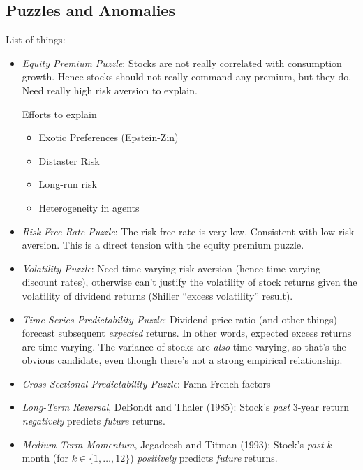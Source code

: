 \documentclass[12pt]{article}
\theoremstyle{plain}
\theoremstyle{definition}
\theoremstyle{remark}
\begin{document}
\clearpage
\subsection{Puzzles and Anomalies}

List of things:
\begin{itemize}
  \item \emph{Equity Premium Puzzle}:
    Stocks are not really correlated with consumption growth.
    Hence stocks should not really command any premium, but they do.
    Need really high risk aversion to explain.

    Efforts to explain
    \begin{itemize}
      \item Exotic Preferences (Epstein-Zin)
      \item Distaster Risk
      \item Long-run risk
      \item Heterogeneity in agents
    \end{itemize}

  \item
    \emph{Risk Free Rate Puzzle}:
    The risk-free rate is very low. Consistent with low risk aversion.
    This is a direct tension with the equity premium puzzle.

  \item
    \emph{Volatility Puzzle}:
    Need time-varying risk aversion (hence time varying discount rates),
    otherwise can't justify the volatility of stock returns given the
    volatility of dividend returns (Shiller ``excess volatility''
    result).

  \item
    \emph{Time Series Predictability Puzzle}:
    Dividend-price ratio (and other things) forecast subsequent
    \emph{expected} returns. In other words, expected excess returns are
    time-varying.
    The variance of stocks are \emph{also} time-varying, so that's the
    obvious candidate, even though there's not a strong empirical
    relationship.

  \item
    \emph{Cross Sectional Predictability Puzzle}:
    Fama-French factors

  \item
    \emph{Long-Term Reversal}, DeBondt and Thaler (1985):
    Stock's \emph{past} 3-year return \emph{negatively} predicts
    \emph{future} returns.

  \item
    \emph{Medium-Term Momentum}, Jegadeesh and Titman (1993):
    Stock's \emph{past} $k$-month (for $k\in\{1,\ldots,12\}$)
    \emph{positively} predicts \emph{future} returns.


\end{itemize}
\end{document}
